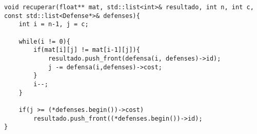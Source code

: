 \begin{lstlisting}
void recuperar(float** mat, std::list<int>& resultado, int n, int c, const std::list<Defense*>& defenses){
    int i = n-1, j = c;

    while(i != 0){
        if(mat[i][j] != mat[i-1][j]){
            resultado.push_front(defensa(i, defenses)->id);
            j -= defensa(i,defenses)->cost;
        }
        i--;
    }
    
    if(j >= (*defenses.begin())->cost)
        resultado.push_front((*defenses.begin())->id);
}
\end{lstlisting}
